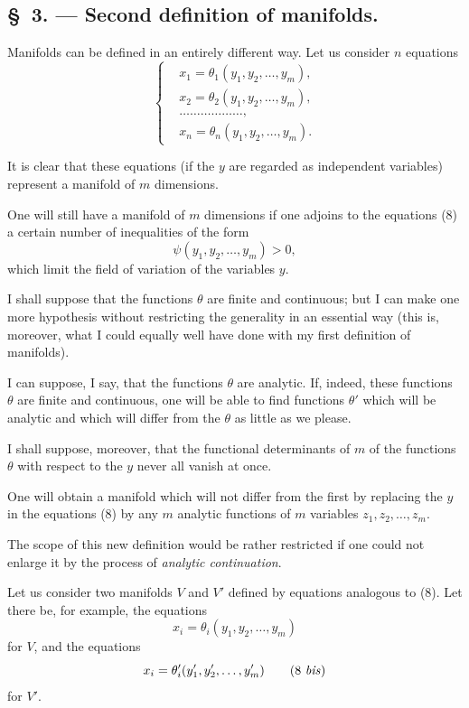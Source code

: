 \documentclass{article}
\begin{document}
\subsection*{\S~3. --- Second definition of manifolds.}

Manifolds can be defined in an entirely different way. Let us consider $n$ equations
\[
\left\{
\begin{aligned}
&x_{1} = \theta_{1}(y_{1}, y_{2}, \ldots, y_{m}),\\
&x_{2} = \theta_{2}(y_{1}, y_{2}, \ldots, y_{m}),\\
&\ldots\ldots\ldots\ldots\ldots\ldots,\\
&x_{n} = \theta_{n}(y_{1}, y_{2}, \ldots, y_{m}).
\end{aligned}
\right.
\tag{8}
\]

It is clear that these equations (if the $y$ are regarded as independent variables) represent a manifold of $m$ dimensions.

One will still have a manifold of $m$ dimensions if one adjoins to the equations (8) a certain number of inequalities of the form
\[
\psi(y_{1}, y_{2}, \ldots, y_{m}) > 0,
\]
which limit the field of variation of the variables $y$.

I shall suppose that the functions $\theta$ are finite and continuous; but I can make one more hypothesis without restricting the generality in an essential way (this is, moreover, what I could equally well have done with my first definition of manifolds).

I can suppose, I say, that the functions $\theta$ are analytic. If, indeed, these functions $\theta$ are finite and continuous, one will be able to find functions $\theta'$ which will be analytic and which will differ from the $\theta$ as little as we please.

I shall suppose, moreover, that the functional determinants of $m$ of the functions $\theta$ with respect to the $y$ never all vanish at once.

One will obtain a manifold which will not differ from the first by replacing the $y$ in the equations (8) by any $m$ analytic functions of $m$ variables $z_{1}, z_{2}, \ldots, z_{m}$.

The scope of this new definition would be rather restricted if one could not enlarge it by the process of \emph{analytic continuation}.

Let us consider two manifolds $V$ and $V'$ defined by equations analogous to (8). Let there be, for example, the equations
\[
x_{i} = \theta_{i}(y_{1}, y_{2}, \ldots, y_{m})
\tag{8}
\]
for $V$, and the equations
\[
x_{i} = \theta'_{i}(y'_{1}, y'_{2}, \ldots, y'_{m})
\tag{8 \textit{bis}}
\]
for $V'$.
\end{document}
